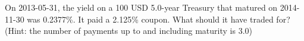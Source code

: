 On 2013-05-31, the yield on a 100 USD 5.0-year Treasury that matured on 2014-11-30 was 0.2377\%. It paid a 2.125\% coupon. What should it have traded for? (Hint: the number of payments up to and including maturity is 3.0)
